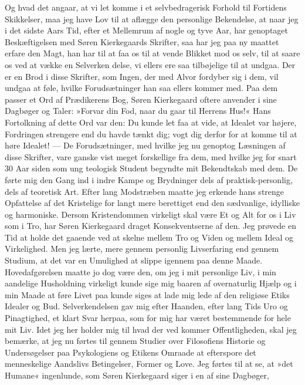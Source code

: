 \documentclass[12pt,a4paper,openany]{book}
\newcommand{\opage}[1]{\marginnote{\footnotesize\textit{[#1]}}}
\begin{document}
Og hvad det angaar, at vi let komme i et selvbedragerisk
Forhold til Fortidens Skikkelser, maa jeg have
Lov til at aflægge den personlige Bekendelse, at naar
jeg i det sidste Aars Tid, efter et Mellemrum af nogle
og tyve Aar, har genoptaget Beskæftigelsen med Søren
Kierkegaards Skrifter, saa har jeg paa ny maattet erfare
den Magt, han har til at faa os til at vende Blikket
mod os selv, til at saare os ved at vække en Selverken%
\opage{3}delse, vi ellers ere saa tilbøjelige til at undgaa. Der er
en Brod i disse Skrifter, som Ingen, der med Alvor fordyber
sig i dem, vil undgaa at føle, hvilke Forudsætninger
han saa ellers kommer med. Paa dem passer et Ord
af Prædikerens Bog, Søren Kierkegaard oftere anvender
i sine Dagbøger og Taler: »Forvar din Fod, naar du
gaar til Herrens Hus!« Hans Fortolkning af dette Ord
var den: Du kunde let faa at vide, at Idealet var
højere, Fordringen strengere end du havde tænkt dig;
vogt dig derfor for at komme til at høre Idealet! --- De
Forudsætninger, med hvilke jeg nu genoptog Læsningen
af disse Skrifter, vare ganske vist meget forskellige fra
dem, med hvilke jeg for snart 30 Aar siden som ung
teologisk Student begyndte mit Bekendtskab med dem.
De førte mig den Gang ind i indre Kampe og Brydninger
dels af praktisk-personlig, dels af teoretisk Art.
Efter lang Modstræben maatte jeg erkende hans strenge
Opfattelse af det Kristelige for langt mere berettiget end
den sædvanlige, idylliske og harmoniske. Dersom Kristendommen
virkeligt skal være Et og Alt for os i Liv
som i Tro, har Søren Kierkegaard draget Konsekventserne
af den. Jeg prøvede en Tid at holde det gaaende
ved at skelne mellem Tro og Viden og mellem Ideal og
Virkelighed. Men jeg lærte, mere gennem personlig Livserfaring
end gennem Studium, at det var en Umulighed
at slippe igennem paa denne Maade. Hovedafgørelsen
maatte jo dog være den, om jeg i mit personlige Liv, i
min aandelige Husholdning virkeligt kunde sige mig
baaren af overnaturlig Hjælp og i min Maade at føre
Livet paa kunde siges at lade mig lede af den religiøse
Etiks Idealer og Bud. Selverkendelsen gav mig efter
Haanden, efter lang Tids Uro og Pinagtighed, et klart
Svar herpaa, som for mig har været bestemmende for
hele mit Liv. Idet jeg her holder mig til hvad der ved%
\opage{4}kommer Offentligheden, skal jeg bemærke, at jeg nu førtes
til gennem Studier over Filosofiens Historie og Undersøgelser
paa Psykologiens og Etikens Omraade at efterspore
det menneskelige Aandslivs Betingelser, Former og
Love. Jeg førtes til at se, at »det Humane« ingenlunde,
som Søren Kierkegaard siger i en af sine Dagbøger,
\end{document}
